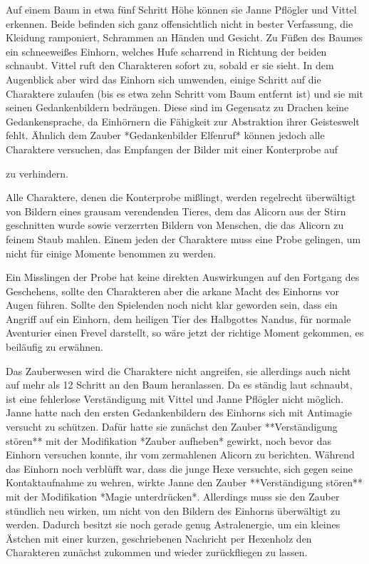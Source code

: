 \platz
{}
\platz
Auf einem Baum in etwa fünf Schritt Höhe können sie Janne Pflögler und Vittel erkennen. Beide befinden sich ganz offensichtlich nicht in bester Verfassung, die Kleidung ramponiert, Schrammen an Händen und Gesicht. Zu Füßen des Baumes ein schneeweißes Einhorn, welches Hufe scharrend in Richtung der beiden schnaubt. Vittel ruft den Charakteren sofort zu, sobald er sie sieht. In dem Augenblick aber wird das Einhorn sich umwenden, einige Schritt auf die Charaktere zulaufen (bis es etwa zehn Schritt vom Baum entfernt ist) und sie mit seinen Gedankenbildern bedrängen. Diese sind im Gegensatz zu Drachen keine Gedankensprache, da Einhörnern die Fähigkeit zur Abstraktion ihrer Geisteswelt fehlt. Ähnlich dem Zauber *Gedankenbilder Elfenruf* können jedoch alle Charaktere versuchen, das Empfangen der Bilder mit einer Konterprobe auf 
\platz
{}

zu verhindern. 

Alle Charaktere, denen die Konterprobe mißlingt, werden  regelrecht überwältigt von Bildern eines grausam verendenden Tieres, dem das Alicorn aus der Stirn geschnitten wurde sowie verzerrten Bildern von Menschen, die das Alicorn zu feinem Staub mahlen. Einem jeden der Charaktere muss eine Probe 
\platz
{}
gelingen, um nicht für einige Momente benommen zu werden. 


Ein Misslingen der Probe hat keine direkten Auswirkungen auf den Fortgang des Geschehens, sollte den Charakteren aber die arkane Macht des Einhorns vor Augen führen. Sollte den Spielenden noch nicht klar geworden sein, dass ein Angriff auf ein Einhorn, dem heiligen Tier des Halbgottes Nandus, für normale Aventurier einen Frevel darstellt, so wäre jetzt der richtige Moment gekommen, es beiläufig zu erwähnen.


Das Zauberwesen wird die Charaktere nicht angreifen, sie allerdings auch nicht auf mehr als 12 Schritt an den Baum heranlassen. Da es ständig laut schnaubt, ist eine fehlerlose Verständigung mit Vittel und Janne Pflögler nicht möglich. Janne hatte nach den ersten Gedankenbildern des Einhorns sich mit Antimagie versucht zu schützen. Dafür hatte sie zunächst den Zauber **Verständigung stören** mit der Modifikation *Zauber aufheben* gewirkt, noch bevor das Einhorn versuchen konnte, ihr vom zermahlenen Alicorn zu berichten. Während das Einhorn noch verblüfft war, dass die junge Hexe versuchte, sich gegen seine Kontaktaufnahme zu wehren, wirkte Janne den Zauber **Verständigung stören** mit der Modifikation *Magie unterdrücken*. Allerdings muss sie den Zauber stündlich neu wirken, um nicht von den Bildern des Einhorns überwältigt zu werden. Dadurch besitzt sie noch gerade genug Astralenergie, um ein kleines Ästchen mit einer kurzen, geschriebenen Nachricht per Hexenholz den Charakteren zunächst zukommen und wieder zurückfliegen zu lassen. 


